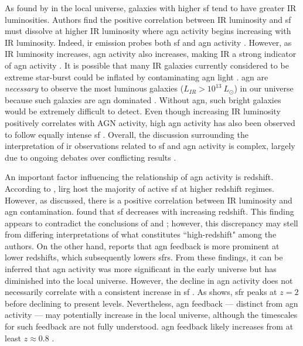 As found by \cite{valiante_backward_2009} in the local universe, galaxies with higher \gls{sf} tend to have greater IR luminosities. Authors \cite{symeonidis_agn_2021} find the positive correlation between IR luminosity and \gls{sf} must dissolve at higher IR luminosity where \gls{agn} activity begins increasing with IR luminosity. Indeed, \gls{ir} emission probes both \gls{sf} and \gls{agn} activity \citep{fu_decomposing_2010}. However, as IR luminosity increases, \gls{agn} activity also increases, making IR a strong indicator of \gls{agn} activity \citep{symeonidis_agn_2021, biviano_spitzer_2011, huang_local_2007, katsianis_evolution_2017}. It is possible that many IR galaxies currently considered to be extreme star-burst could be inflated by contaminating \gls{agn} light \citep{symeonidis_agn_2021}. \gls{agn} are \textit{necessary} to observe the most luminous galaxies ($L_{IR} > 10^{13} \ L_\odot$) in our universe because such galaxies are \gls{agn} dominated \citep{symeonidis_agn_2021}. Without \gls{agn}, such bright galaxies would be extremely difficult to detect. Even though increasing IR luminosity positively correlates with AGN activity, high \gls{agn} activity has also been observed to follow equally intense \gls{sf} \citep{hopkins_cosmological_2008, katsianis_evolution_2017}. Overall, the discussion surrounding the interpretation of \gls{ir} observations related to \gls{sf} and \gls{agn} activity is complex, largely due to ongoing debates over conflicting results \citep{grazian_galaxy_2015}. 

An important factor influencing the relationship of \gls{agn} activity is redshift. According to \cite{fu_decomposing_2010}, \gls{lirg} host the majority of active \gls{sf} at higher redshift regimes. However, as discussed, there is a positive correlation between IR luminosity and \gls{agn} contamination. \cite{wu_mid-infrared_2011} found that \gls{sf} decreases with increasing redshift. This finding appears to contradict the conclusions of \cite{valiante_backward_2009} and \cite{fu_decomposing_2010}; however, this discrepancy may stell from differing interpretations of what constitutes ``high-redshift" among the authors. On the other hand, \cite{katsianis_evolution_2017} reports that \gls{agn} feedback is more prominent at lower redshifts, which subsequently lowers \gls{sfr}s. From these findings, it can be inferred that \gls{agn} activity was more significant in the early universe but has diminished into the local universe. However, the decline in \gls{agn} activity does not necessarily correlate with a consistent increase in \gls{sf} \citep{fanidakis_evolution_2012}. As \cite{madau_cosmic_2014} shows, \gls{sfr} peaks at $z=2$ before declining to present levels. Nevertheless, \gls{agn} feedback --- distinct from \gls{agn} activity --- may potentially increase in the local universe, although the timescales for such feedback are not fully understood. \gls{agn} feedback likely increases from at least $z\approx0.8$ \citep{katsianis_evolution_2017}. 

